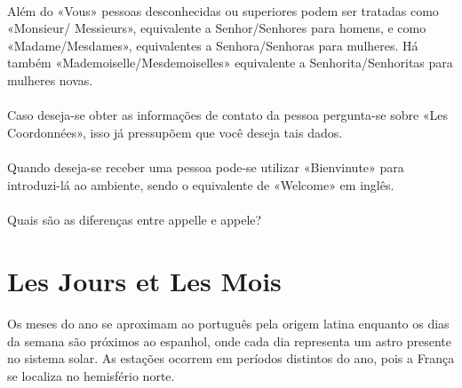 \documentclass{article}
\begin{document}
        \paragraph{}Além do «Vous» pessoas desconhecidas ou superiores podem ser tratadas como «Monsieur/ Messieurs», equivalente a Senhor/Senhores para homens, e  como «Madame/Mesdames», equivalentes a Senhora/Senhoras para mulheres. Há também «Mademoiselle/Mesdemoiselles» equivalente a Senhorita/Senhoritas para mulheres novas.
        
        \paragraph{}Caso deseja-se obter as informações de contato da pessoa pergunta-se sobre «Les Coordonnées», isso já pressupõem que você deseja tais dados.

        \paragraph{}Quando deseja-se receber uma pessoa pode-se utilizar «Bienvinute» para introduzi-lá ao ambiente, sendo o equivalente de «Welcome» em inglês.

        \paragraph{}Quais são as diferenças entre appelle e appele?
\newpage

\section{Les Jours et Les Mois}
    \paragraph{}Os meses do ano se aproximam ao português pela origem latina enquanto os dias da semana são próximos ao espanhol, onde cada dia representa um astro presente no sistema solar. As estações ocorrem em períodos distintos do ano, pois a França se localiza no hemisfério norte.
        
\end{document}
